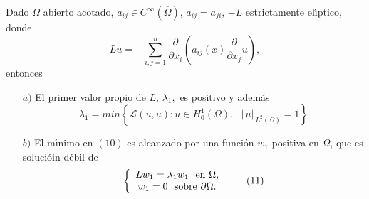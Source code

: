 




\begin{theorem}
Dado $\Omega$ abierto acotado, $a_{ij}\in C^{\infty}\left(  \overline{\Omega
}\right)  $, $a_{ij}=a_{ji}$, $-L$ estrictamente el\'{\i}ptico, donde
\[
Lu=-\sum_{i,j=1}^{n}\frac{\partial}{\partial x_{i}}\left(  a_{ij}\left(
x\right)  \frac{\partial}{\partial x_{j}}u\right)  ,
\]
entonces

\begin{enumerate}
\item[$a)$] El primer valor propio de $L$, $\lambda_{1},$ es positivo y
adem\'{a}s
\begin{equation}
\lambda_{1}=min\left\{  \mathcal{L}\left(  u,u\right)  :u\in
H_{0}^{1}\left( \Omega\right)  ,\text{ }\left\Vert u\right\Vert
_{L^{2}\left(  \Omega\right)
}=1\right\}  \tag{10}%
\end{equation}


\item[$b)$] El m\'{\i}nimo en $\left(  10\right)  $ es alcanzado por una
funci\'{o}n $w_{1}$ positiva en $\Omega$, que es soluci\'{o}in d\'{e}bil de
\begin{equation}
\left\{
\begin{array}
[c]{c}%
Lw_{1}=\lambda_{1}w_{1}\text{ \ en }\Omega,\\
w_{1}=0\text{ \ sobre }\partial\Omega.
\end{array}
\right.  \tag{11}%
\end{equation}

\end{enumerate}
\end{theorem}
